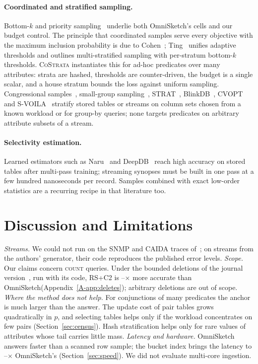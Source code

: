 \documentclass[sigconf]{acmart}
\newcommand{\cs}{\textsc{CoStrata}\xspace}
\newcommand{\omni}{OmniSketch\xspace}
\newcommand{\apx}[1]{Appendix~\ref{A-#1}}
\begin{document}
\paragraph{Coordinated and stratified sampling.} Bottom-$k$ and priority sampling~\cite{bottomk,priority}
underlie both \omni's cells and our budget control. The principle that coordinated samples serve every
objective with the maximum inclusion probability is due to Cohen~\cite{cohen-mo}; Ting~\cite{ting-ats}
unifies adaptive thresholds and outlines multi-stratified sampling with per-stratum bottom-$k$
thresholds. \cs instantiates this for ad-hoc predicates over many attributes: strata are hashed, thresholds
are counter-driven, the budget is a single scalar, and a house stratum bounds the loss against uniform
sampling. Congressional samples~\cite{congress}, small-group sampling~\cite{smallgroup}, STRAT~\cite{strat},
BlinkDB~\cite{blinkdb}, CVOPT~\cite{cvopt} and S-VOILA~\cite{svoila} stratify stored tables or streams on
column sets chosen from a known workload or for group-by queries; none targets predicates on arbitrary
attribute subsets of a stream.

\paragraph{Selectivity estimation.} Learned estimators such as Naru~\cite{naru} and DeepDB~\cite{deepdb}
reach high accuracy on stored tables after multi-pass training; streaming synopses must be built in one
pass at a few hundred nanoseconds per record. Samples combined with exact low-order statistics are a
recurring recipe in that literature too.

\section{Discussion and Limitations}\label{sec:discussion}

\emph{Streams.} We could not run on the SNMP and CAIDA traces of~\cite{omni}; on streams from the authors'
generator, their code reproduces the published error levels. \emph{Scope.} Our claims concern \textsc{count} queries. Under the bounded deletions of the journal
version~\cite{omni-vldbj}, run with its code, RS+C2 is \NumDelROmniVsCalTwoLo--\NumDelROmniVsCalTwoHi$\times$
more accurate than \omni (\apx{app:deletes}); arbitrary deletions are out of scope.
\emph{Where the method does not help.} For conjunctions of many predicates the anchor is much larger
than the answer. The update cost of pair tables grows quadratically in $p$, and selecting tables helps
only if the workload concentrates on few pairs (Section~\ref{sec:census}). Hash stratification helps only
for rare values of attributes whose tail carries little mass. \emph{Latency and hardware.} \omni answers
faster than a scanned row sample; the bucket index brings the latency to
\NumQlatIndexVsOmniLo--\NumQlatIndexVsOmniHi$\times$ \omni's (Section~\ref{sec:speed}). We did not
evaluate multi-core ingestion.
\end{document}
